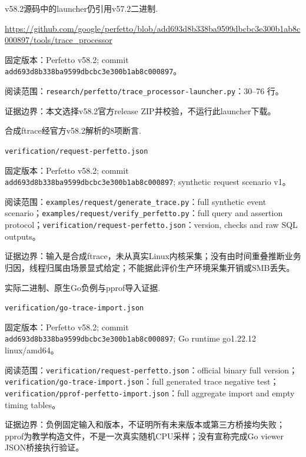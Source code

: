 \documentclass[UTF8,fontset=fandol,openany,11pt]{ctexbook}
\begin{document}
\begin{thebibliography}{999}
 v58.2源码中的launcher仍引用v57.2二进制.\par
\url{https://github.com/google/perfetto/blob/add693d8b338ba9599dbcbc3e300b1ab8c000897/tools/trace_processor}\par
{\small\raggedright 固定版本：Perfetto v58.2; commit \texttt{add693d8\allowbreak{}b338ba95\allowbreak{}99dbcbc3\allowbreak{}e300b1ab\allowbreak{}8c000897}。\par
阅读范围：\nolinkurl{research/perfetto/trace_processor-launcher.py}：30–76 行。\par
证据边界：本文选择v58.2官方release ZIP并校验，不运行此launcher下载。
}

 合成ftrace经官方v58.2解析的8项断言.\par
\nolinkurl{verification/request-perfetto.json}\par
{\small\raggedright 固定版本：Perfetto v58.2; commit \texttt{add693d8\allowbreak{}b338ba95\allowbreak{}99dbcbc3\allowbreak{}e300b1ab\allowbreak{}8c000897}; synthetic request scenario v1。\par
阅读范围：\nolinkurl{examples/request/generate_trace.py}：full synthetic event scenario；\nolinkurl{examples/request/verify_perfetto.py}：full query and assertion protocol；\nolinkurl{verification/request-perfetto.json}：version, checks and raw SQL outputs。\par
证据边界：输入是合成ftrace，未从真实Linux内核采集；没有由时间重叠推断业务归因，线程归属由场景显式给定；不能据此评价生产环境采集开销或SMB丢失。
}

 实际二进制、原生Go负例与pprof导入证据.\par
\nolinkurl{verification/go-trace-import.json}\par
{\small\raggedright 固定版本：Perfetto v58.2; commit \texttt{add693d8\allowbreak{}b338ba95\allowbreak{}99dbcbc3\allowbreak{}e300b1ab\allowbreak{}8c000897}; Go runtime go1.22.12 linux/amd64。\par
阅读范围：\nolinkurl{verification/request-perfetto.json}：official binary full version；\nolinkurl{verification/go-trace-import.json}：full generated trace negative test；\nolinkurl{verification/pprof-perfetto-import.json}：full aggregate import and empty timing tables。\par
证据边界：负例固定输入和版本，不证明所有未来版本或第三方桥接均失败；pprof为教学构造文件，不是一次真实随机CPU采样；没有宣称完成Go viewer JSON桥接执行验证。
}

\end{thebibliography}
\end{document}
